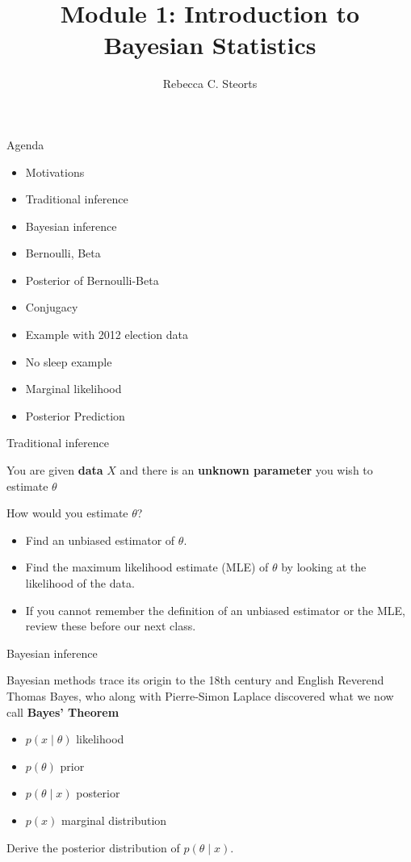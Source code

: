 \documentclass[
  ignorenonframetext,
]{beamer}
\title{Module 1: Introduction to Bayesian Statistics}
\author{Rebecca C. Steorts}
\date{}
\providecommand{\tightlist}{%
  \setlength{\itemsep}{0pt}\setlength{\parskip}{0pt}}
\begin{document}
\frame{\titlepage}

\begin{frame}{Agenda}
\protect\hypertarget{agenda}{}

\begin{itemize}
\tightlist
\item
  Motivations
\item
  Traditional inference
\item
  Bayesian inference
\item
  Bernoulli, Beta
\item
  Posterior of Bernoulli-Beta
\item
  Conjugacy
\item
  Example with 2012 election data
\item
  No sleep example
\item
  Marginal likelihood
\item
  Posterior Prediction
\end{itemize}

\end{frame}

\begin{frame}{Traditional inference}
\protect\hypertarget{traditional-inference}{}

You are given \textbf{data} \(X\) and there is an \textbf{unknown
parameter} you wish to estimate \textbf{\(\theta\)}

How would you estimate \(\theta\)?

\begin{itemize}
\tightlist
\item
  Find an unbiased estimator of \(\theta\).
\item
  Find the maximum likelihood estimate (MLE) of \(\theta\) by looking at
  the likelihood of the data.
\item
  If you cannot remember the definition of an unbiased estimator or the
  MLE, review these before our next class.
\end{itemize}

\end{frame}

\begin{frame}{Bayesian inference}
\protect\hypertarget{bayesian-inference}{}

Bayesian methods trace its origin to the 18th century and English
Reverend Thomas Bayes, who along with Pierre-Simon Laplace discovered
what we now call \textbf{Bayes' Theorem}

\begin{itemize}
\tightlist
\item
  \(p(x \mid \theta)\) likelihood
\item
  \(p(\theta)\) prior
\item
  \(p(\theta \mid x)\) posterior
\item
  \(p(x)\) marginal distribution
\end{itemize}

Derive the posterior distribution of \(p(\theta \mid x).\)

\end{frame}
\end{document}
